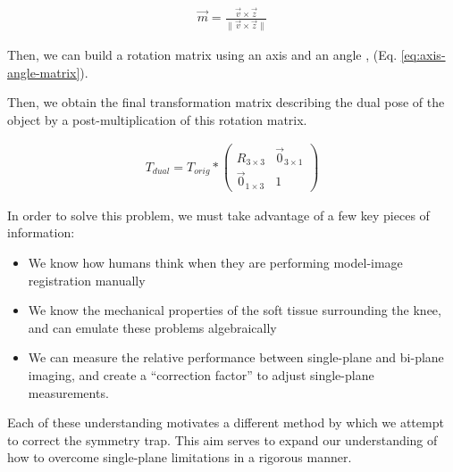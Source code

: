 \begin{equation}
    \begin{aligned}
        \vec{m} = \frac{\vec{v} \times \vec{z}}{\|\vec{v} \times \vec{z}\|}
    \end{aligned}
    \label{eq:perp-axis}
\end{equation}

Then, we can build a rotation matrix using an axis and an angle \cite{craneKinematicAnalysisRobot2008}, (Eq. \ref{eq:axis-angle-matrix}).

Then, we obtain the final transformation matrix describing the dual pose of the object by a post-multiplication of this rotation matrix.

\begin{equation}
    \begin{aligned}
        T_{dual} = T_{orig} * \begin{pmatrix}
            R_{3 \times 3} & \vec{0}_{3 \times 1} \\ \vec{0}_{1 \times 3} & 1
        \end{pmatrix}
    \end{aligned}
    \label{eq:rotation-matrix-mult}
\end{equation}


In order to solve this problem, we must take advantage of a few key pieces of information:

\begin{itemize}
    \item We know how humans think when they are performing model-image registration manually
    \item We know the mechanical properties of the soft tissue surrounding the knee, and can emulate these problems algebraically
    \item We can measure the relative performance between single-plane and bi-plane imaging, and create a ``correction factor'' to adjust single-plane measurements.
\end{itemize}

Each of these understanding motivates a different method by which we attempt to correct the symmetry trap. This aim serves to expand our understanding of how to overcome single-plane limitations in a rigorous manner.

